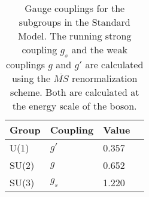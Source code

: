 
\begin{table}[htp]
\caption{Gauge couplings for the subgroups in the Standard Model. The running strong coupling $g_s$  and the weak couplings $g$ and $g'$ are calculated using the $\overline{MS}$ renormalization scheme. Both are calculated at the energy scale of the \Z boson.}
\begin{center}
\begin{tabular}{l l l l}
\toprule
Group & Coupling & Value \\
\midrule
U(1)   & $g'$  & 0.357 \\
SU(2)  & $g$   & 0.652 \\
SU(3)  & $g_s$ & 1.220 \\
\bottomrule
\end{tabular}
\label{tab:couplings}
\end{center}
\end{table}

